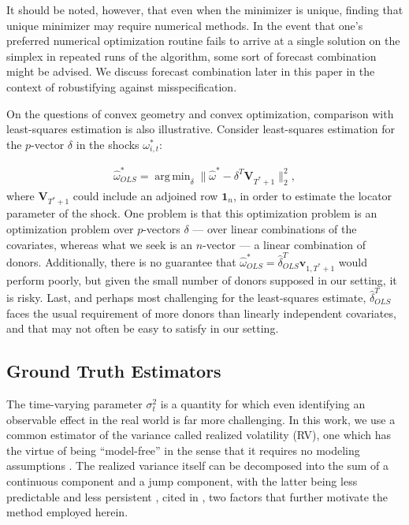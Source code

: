 \documentclass{uiucthesis2021}
\newcommand{\x}{\textbf{v}}
\DeclareMathOperator*{\argmin}{arg\,min} %
\theoremstyle{definition}
\begin{document}
It should be noted, however, that even when the minimizer is unique, finding that unique minimizer may require numerical methods.  In the event that one's preferred numerical optimization routine fails to arrive at a single solution on the simplex in repeated runs of the algorithm, some sort of forecast combination might be advised.  We discuss forecast combination later in this paper in the context of robustifying against misspecification.

On the questions of convex geometry and convex optimization, comparison with least-squares estimation is also illustrative.  Consider least-squares estimation for the $p$-vector $\delta$ in the shocks $\omega^{*}_{i,t}$:

\begin{align*}
 \hat\omega^{*}_{OLS} =\argmin_{\delta}\|\hat{\omega}^{*} - \delta^{T}\textbf{V}_{T^{*}+1}\|^{2}_{2},
\end{align*}
where $\textbf{V}_{T^{*}+1}$ could include an adjoined row $\textbf{1}_{n}$, in order to estimate the locator parameter of the shock.  One problem is that this optimization problem is an optimization problem over $p$-vectors $\delta$ --- over linear combinations of the covariates, whereas what we seek is an $n$-vector --- a linear combination of donors.  Additionally, there is no guarantee that $\hat\omega^{*}_{OLS} = \hat{\delta}_{OLS}^{T}\x_{1,T^{*}+1}$ would perform poorly, but given the small number of donors supposed in our setting, it is risky.  Last, and perhaps most challenging for the least-squares estimate, $\hat{\delta}_{OLS}^{T}$ faces the usual requirement of more donors than linearly independent covariates, and that may not often be easy to satisfy in our setting.

\subsection{Ground Truth Estimators}
    \label{Ground Truth Estimators}
    
    The time-varying parameter $\sigma^{2}_{t}$ is a quantity for which even identifying an observable effect in the real world is far more challenging.  In this work, we use a common estimator of the variance called realized volatility (RV), one which has the virtue of being ``model-free'' in the sense that it requires no modeling assumptions \cite[][]{andersen2010stochastic}.  The realized variance itself can be decomposed into the sum of a continuous component and a jump component, with the latter being less predictable and less persistent \cite[][]{andersen2007roughing}, cited in \cite[][]{de2006forecasting}, two factors that further motivate the method employed herein.
    
\end{document}
